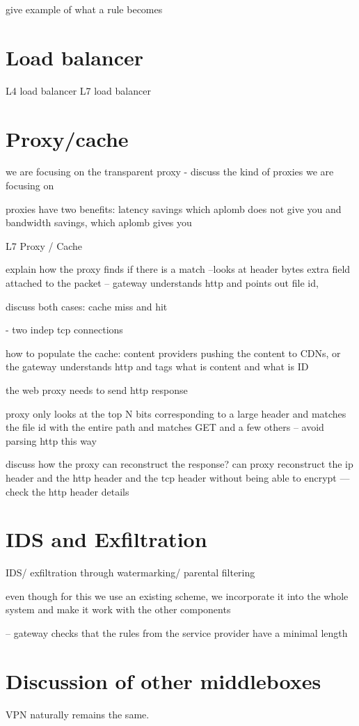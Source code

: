 give example of what a rule becomes

\section{Load balancer}\label{sec:loadb}

L4 load balancer
L7 load balancer

\section{Proxy/cache}\label{sec:proxy}


we are focusing on the transparent proxy
- discuss the kind of proxies we are focusing on

proxies have two benefits: latency savings which aplomb does not give you 
and bandwidth savings, which aplomb gives you
 
L7 Proxy / Cache

explain how the proxy finds if there is  a match --looks at header bytes
extra field attached to the packet -- gateway understands http and points out file id, 

discuss both cases: cache miss and hit

- two indep tcp connections 

how to populate the cache: content providers pushing the content to CDNs, or the gateway understands
http and tags what is content and what is ID

the web proxy needs to send http response 

proxy only looks at the top N bits corresponding to a large header and matches the file id with the entire path
and matches GET and a few others -- avoid parsing http this way


discuss how the proxy can reconstruct the response?
can proxy reconstruct the ip header and the http header  and the tcp header without being able to encrypt
--- check the http header details

\section{IDS and Exfiltration}\label{sec:IDS}

IDS/ exfiltration through watermarking/ parental filtering

even though for this we use an existing scheme, we incorporate it into the whole
system and make it work with the other components

-- gateway checks that the rules from the service provider have a minimal length 


\section{Discussion of other middleboxes}\label{sec:vpn} \label{sec:other} \label{sec:not_supp}

VPN naturally remains the same. 